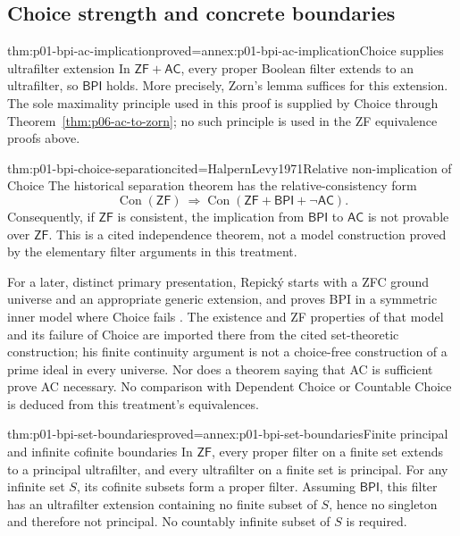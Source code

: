 \subsection{Choice strength and concrete boundaries}
\label{sec:p01-bpi-choice-strength}

\begin{hbtheorem}{thm:p01-bpi-ac-implication}{proved=annex:p01-bpi-ac-implication}{Choice supplies ultrafilter extension}
In \(\mathsf{ZF}+\mathsf{AC}\), every proper Boolean filter extends
to an ultrafilter, so \(\mathsf{BPI}\) holds. More precisely, Zorn's
lemma suffices for this extension. The sole maximality principle used in
this proof is supplied by Choice through
Theorem~\ref{thm:p06-ac-to-zorn}; no such principle is used in the ZF
equivalence proofs above.
\end{hbtheorem}

\begin{hbtheorem}{thm:p01-bpi-choice-separation}{cited=HalpernLevy1971}{Relative non-implication of Choice}
The historical separation theorem has the relative-consistency form
\[
 \operatorname{Con}(\mathsf{ZF})\ \Longrightarrow
 \operatorname{Con}(\mathsf{ZF}+\mathsf{BPI}+\neg\mathsf{AC}).
\]
Consequently, if \(\mathsf{ZF}\) is consistent, the implication from
\(\mathsf{BPI}\) to \(\mathsf{AC}\) is not provable over
\(\mathsf{ZF}\). This is a cited independence theorem, not a model
construction proved by the elementary filter arguments in this treatment.
\end{hbtheorem}

For a later, distinct primary presentation, Repick\'y starts with a ZFC
ground universe and an appropriate generic extension, and proves BPI in a
symmetric inner model where Choice fails \cite{Repicky2015BPI}.
The existence and ZF properties of that model and its failure of Choice are
imported there from the cited set-theoretic construction; his finite
continuity argument is not a choice-free construction of a prime ideal in
every universe. Nor does a theorem saying that AC is sufficient prove AC
necessary. No comparison with Dependent Choice or Countable Choice is
deduced from this treatment's equivalences.

\begin{hbcorollary}{thm:p01-bpi-set-boundaries}{proved=annex:p01-bpi-set-boundaries}{Finite principal and infinite cofinite boundaries}
In \(\mathsf{ZF}\), every proper filter on a finite set extends to a
principal ultrafilter, and every ultrafilter on a finite set is principal.
For any infinite set \(S\), its cofinite subsets form a proper filter.
Assuming \(\mathsf{BPI}\), this filter has an ultrafilter extension
containing no finite subset of \(S\), hence no singleton and therefore
not principal. No countably infinite subset of \(S\) is required.
\end{hbcorollary}

